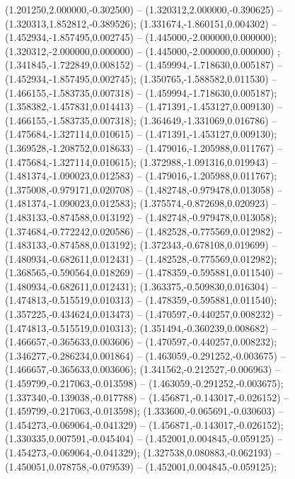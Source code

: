  (1.201250,2.000000,-0.302500) -- (1.320312,2.000000,-0.390625) -- (1.320313,1.852812,-0.389526);
 (1.331674,-1.860151,0.004302) -- (1.452934,-1.857495,0.002745) -- (1.445000,-2.000000,0.000000);
 (1.320312,-2.000000,0.000000) -- (1.445000,-2.000000,0.000000) ;
 (1.341845,-1.722849,0.008152) -- (1.459994,-1.718630,0.005187) -- (1.452934,-1.857495,0.002745);
 (1.350765,-1.588582,0.011530) -- (1.466155,-1.583735,0.007318) -- (1.459994,-1.718630,0.005187);
 (1.358382,-1.457831,0.014413) -- (1.471391,-1.453127,0.009130) -- (1.466155,-1.583735,0.007318);
 (1.364649,-1.331069,0.016786) -- (1.475684,-1.327114,0.010615) -- (1.471391,-1.453127,0.009130);
 (1.369528,-1.208752,0.018633) -- (1.479016,-1.205988,0.011767) -- (1.475684,-1.327114,0.010615);
 (1.372988,-1.091316,0.019943) -- (1.481374,-1.090023,0.012583) -- (1.479016,-1.205988,0.011767);
 (1.375008,-0.979171,0.020708) -- (1.482748,-0.979478,0.013058) -- (1.481374,-1.090023,0.012583);
 (1.375574,-0.872698,0.020923) -- (1.483133,-0.874588,0.013192) -- (1.482748,-0.979478,0.013058);
 (1.374684,-0.772242,0.020586) -- (1.482528,-0.775569,0.012982) -- (1.483133,-0.874588,0.013192);
 (1.372343,-0.678108,0.019699) -- (1.480934,-0.682611,0.012431) -- (1.482528,-0.775569,0.012982);
 (1.368565,-0.590564,0.018269) -- (1.478359,-0.595881,0.011540) -- (1.480934,-0.682611,0.012431);
 (1.363375,-0.509830,0.016304) -- (1.474813,-0.515519,0.010313) -- (1.478359,-0.595881,0.011540);
 (1.357225,-0.434624,0.013473) -- (1.470597,-0.440257,0.008232) -- (1.474813,-0.515519,0.010313);
 (1.351494,-0.360239,0.008682) -- (1.466657,-0.365633,0.003606) -- (1.470597,-0.440257,0.008232);
 (1.346277,-0.286234,0.001864) -- (1.463059,-0.291252,-0.003675) -- (1.466657,-0.365633,0.003606);
 (1.341562,-0.212527,-0.006963) -- (1.459799,-0.217063,-0.013598) -- (1.463059,-0.291252,-0.003675);
 (1.337340,-0.139038,-0.017788) -- (1.456871,-0.143017,-0.026152) -- (1.459799,-0.217063,-0.013598);
 (1.333600,-0.065691,-0.030603) -- (1.454273,-0.069064,-0.041329) -- (1.456871,-0.143017,-0.026152);
 (1.330335,0.007591,-0.045404) -- (1.452001,0.004845,-0.059125) -- (1.454273,-0.069064,-0.041329);
 (1.327538,0.080883,-0.062193) -- (1.450051,0.078758,-0.079539) -- (1.452001,0.004845,-0.059125);
